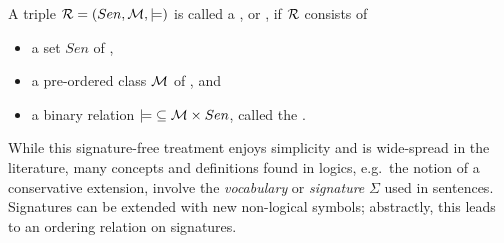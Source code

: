 \documentclass[10pt,%
\ifpretendfinal
final%
\else
draft%
\fi,
]{scrreprt}
\newcommand*{\syntax}[1]{\texttt{#1}}
\begin{document}
\begin{definition}\label{def:room}
A triple ${\cal R}=(Sen,{{\cal M},\models)}$  is called a  , or , if ${\cal R}$  consists of
\begin{itemize}
\item a set $Sen$ of ,
\item a pre-ordered class
${\cal M}$ of , and
\item a binary relation
${\models}\subseteq {\cal M} \times Sen$, called the .
\end{itemize}
\end{definition}


While this signature-free treatment enjoys simplicity and is
wide-spread in the literature, many concepts and definitions found in
logics, e.g.\ the notion of a conservative extension, involve the
\emph{vocabulary} or \emph{signature} $\Sigma$ \label{vocabulary} used
in sentences.  Signatures can be extended with new non-logical symbols;
abstractly, this leads to an ordering relation on signatures.
\end{document}
